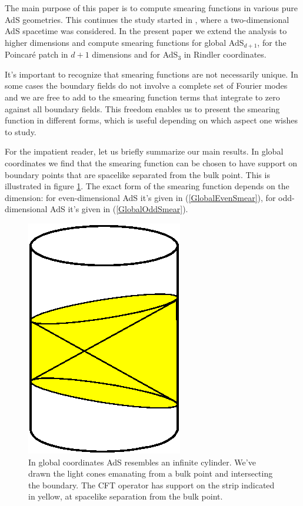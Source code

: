 \documentclass[12pt]{article}
\begin{document}
The main purpose of this paper is to compute smearing functions in
various pure AdS geometries.  This continues the study started in
\cite{hkll}, where a two-dimensional AdS spacetime was considered. In
the present paper we extend the analysis to higher dimensions and
compute smearing functions for global AdS${}_{d+1}$, for the
Poincar\'e patch in $d+1$ dimensions and for AdS${}_3$ in Rindler
coordinates.

It's important to recognize that smearing functions are not
necessarily unique.  In some cases the boundary fields do not involve
a complete set of Fourier modes and we are free to add to the smearing
function terms that integrate to zero against all boundary
fields. This freedom enables us to present the smearing function in
different forms, which is useful depending on which aspect one wishes
to study.

For the impatient reader, let us briefly summarize our main results.
In global coordinates we find that the smearing function can be chosen
to have support on boundary points that are spacelike separated from
the bulk point.  This is illustrated in figure \ref{GlobalFig}.  The
exact form of the smearing function depends on the dimension: for
even-dimensional AdS it's given in (\ref{GlobalEvenSmear}), for
odd-dimensional AdS it's given in (\ref{GlobalOddSmear}).

\begin{figure}
\centerline{\includegraphics{global.eps}}
\caption{In global coordinates AdS resembles an infinite cylinder.
We've drawn the light cones emanating from a bulk point and
intersecting the boundary.  The CFT operator has support on the
strip indicated in yellow, at spacelike separation from the bulk
point.}
\label{GlobalFig}
\end{figure}
\end{document}
